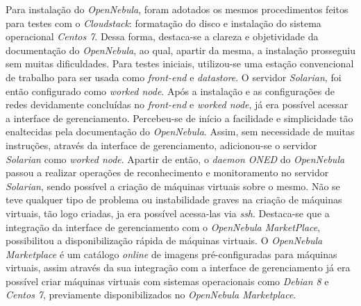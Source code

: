 Para instalação do \textit{OpenNebula}, foram adotados os mesmos procedimentos feitos para testes com o \textit{Cloudstack}: formatação do disco e instalação do sistema operacional \textit{Centos 7}. Dessa forma, destaca-se a clareza e objetividade da documentação do \textit{OpenNebula}, ao qual, apartir da mesma, a instalação prosseguiu sem muitas dificuldades. Para testes iniciais, utilizou-se uma estação convencional de trabalho para ser usada como \textit{front-end} e \textit{datastore}. O servidor \textit{Solarian}, foi então configurado como \textit{worked node}. Após a instalação e as configurações de redes devidamente concluídas no \textit{front-end} e \textit{worked node}, já era possível acessar a interface de gerenciamento. Percebeu-se de início a facilidade e simplicidade tão enaltecidas pela documentação do \textit{OpenNebula}. Assim, sem necessidade de muitas instruções, através da interface de gerenciamento, adicionou-se o servidor \textit{Solarian} como \textit{worked node}. Apartir de então, o \textit{daemon ONED} do \textit{OpenNebula} passou a realizar operações de reconhecimento e monitoramento no servidor \textit{Solarian}, sendo possível a criação de máquinas virtuais sobre o mesmo. Não se teve qualquer tipo de problema ou instabilidade graves na criação de máquinas virtuais, tão logo criadas, ja era possível acessa-las via \textit{ssh}. Destaca-se que a integração da interface de gerenciamento com o \textit{OpenNebula MarketPlace}, possibilitou a disponibilização rápida de máquinas virtuais. O \textit{OpenNebula Marketplace} é um catálogo \textit{online} de imagens pré-configuradas para máquinas virtuais, assim através da sua integração com a interface de gerenciamento já era possível criar máquinas virtuais com sistemas operacionais como \textit{Debian 8} e \textit{Centos 7}, previamente disponibilizados no \textit{OpenNebula Marketplace}. 

